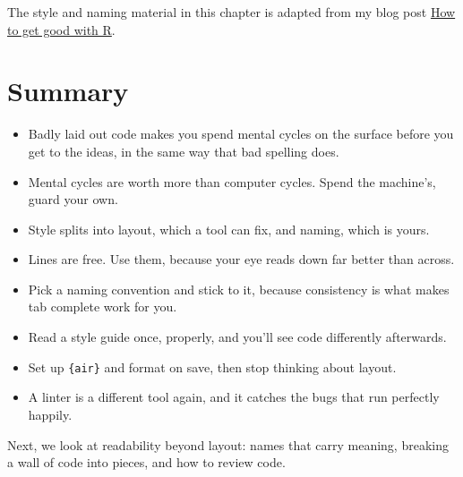 \documentclass[
  letterpaper,
  justified,
  a4paper]{tufte-book}
\providecommand{\tightlist}{%
  \setlength{\itemsep}{0pt}\setlength{\parskip}{0pt}}
\providecommand{\tightlist}{%
  \setlength{\itemsep}{0pt}\setlength{\parskip}{0pt}}
\begin{document}
\begin{tcolorbox}[enhanced jigsaw, arc=.35mm, bottomrule=.15mm, bottomtitle=1mm, breakable, colback=white, colbacktitle=quarto-callout-tip-color!10!white, colframe=quarto-callout-tip-color-frame, coltitle=black, left=2mm, leftrule=.75mm, opacityback=0, opacitybacktitle=0.6, rightrule=.15mm, title=\textcolor{quarto-callout-tip-color}{\faLightbulb}\hspace{0.5em}{Read more}, titlerule=0mm, toprule=.15mm, toptitle=1mm]

The style and naming material in this chapter is adapted from my blog
post
\href{https://www.njtierney.com/posts/2023-10-30-how-to-get-good-with-r/\#stick-to-a-style-guide}{How
to get good with R}.

\end{tcolorbox}

\section{Summary}\label{summary-1}

\begin{itemize}
\tightlist
\item
  Badly laid out code makes you spend mental cycles on the surface
  before you get to the ideas, in the same way that bad spelling does.
\item
  Mental cycles are worth more than computer cycles. Spend the
  machine's, guard your own.
\item
  Style splits into layout, which a tool can fix, and naming, which is
  yours.
\item
  Lines are free. Use them, because your eye reads down far better than
  across.
\item
  Pick a naming convention and stick to it, because consistency is what
  makes tab complete work for you.
\item
  Read a style guide once, properly, and you'll see code differently
  afterwards.
\item
  Set up \texttt{\{air\}} and format on save, then stop thinking about
  layout.
\item
  A linter is a different tool again, and it catches the bugs that run
  perfectly happily.
\end{itemize}

Next, we look at readability beyond layout: names that carry meaning,
breaking a wall of code into pieces, and how to review code.

\end{document}
